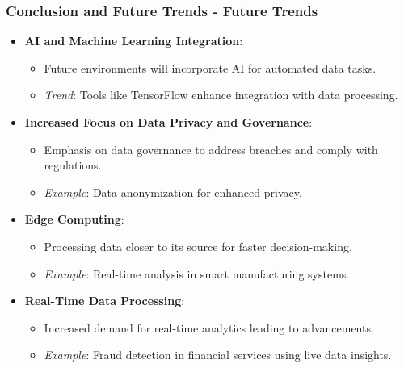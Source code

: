 \documentclass[aspectratio=169]{beamer}
\begin{document}
\begin{frame}[fragile]
    \frametitle{Conclusion and Future Trends - Future Trends}
    \begin{itemize}
        \item \textbf{AI and Machine Learning Integration}:
        \begin{itemize}
            \item Future environments will incorporate AI for automated data tasks.
            \item \textit{Trend}: Tools like TensorFlow enhance integration with data processing.
        \end{itemize}

        \item \textbf{Increased Focus on Data Privacy and Governance}:
        \begin{itemize}
            \item Emphasis on data governance to address breaches and comply with regulations.
            \item \textit{Example}: Data anonymization for enhanced privacy.
        \end{itemize}

        \item \textbf{Edge Computing}:
        \begin{itemize}
            \item Processing data closer to its source for faster decision-making.
            \item \textit{Example}: Real-time analysis in smart manufacturing systems.
        \end{itemize}
        
        \item \textbf{Real-Time Data Processing}:
        \begin{itemize}
            \item Increased demand for real-time analytics leading to advancements.
            \item \textit{Example}: Fraud detection in financial services using live data insights.
        \end{itemize}
    \end{itemize}
\end{frame}
\end{document}
